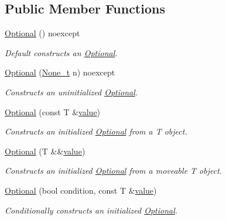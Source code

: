 \subsection*{Public Member Functions}
\begin{DoxyCompactItemize}
\item 
\hyperlink{classmcurses_1_1Optional_a623c4f75b05b17ec7ad6d80faa302a5b}{Optional} () noexcept
\begin{DoxyCompactList}\small\item\em Default constructs an \hyperlink{classmcurses_1_1Optional}{Optional}. \end{DoxyCompactList}\item 
\hyperlink{classmcurses_1_1Optional_a59e637ea31df67b8a2453597603b1493}{Optional} (\hyperlink{classmcurses_1_1None__t}{None\+\_\+t} n) noexcept
\begin{DoxyCompactList}\small\item\em Constructs an uninitialized \hyperlink{classmcurses_1_1Optional}{Optional}. \end{DoxyCompactList}\item 
\hyperlink{classmcurses_1_1Optional_a337b6aa5d069a287cb76867b912dfb47}{Optional} (const T \&\hyperlink{classmcurses_1_1Optional_ad366988d0311c9f6d4de369f222f248f}{value})
\begin{DoxyCompactList}\small\item\em Constructs an initialized \hyperlink{classmcurses_1_1Optional}{Optional} from a T object. \end{DoxyCompactList}\item 
\hyperlink{classmcurses_1_1Optional_acacbd9b1e8a927de478bff6daea6bb96}{Optional} (T \&\&\hyperlink{classmcurses_1_1Optional_ad366988d0311c9f6d4de369f222f248f}{value})
\begin{DoxyCompactList}\small\item\em Constructs an initialized \hyperlink{classmcurses_1_1Optional}{Optional} from a moveable T object. \end{DoxyCompactList}\item 
\hyperlink{classmcurses_1_1Optional_ae0408366bfb3d0b11ba60004871b863e}{Optional} (bool condition, const T \&\hyperlink{classmcurses_1_1Optional_ad366988d0311c9f6d4de369f222f248f}{value})
\begin{DoxyCompactList}\small\item\em Conditionally constructs an initialized \hyperlink{classmcurses_1_1Optional}{Optional}. \end{DoxyCompactList}\item 

\end{DoxyCompactItemize}
